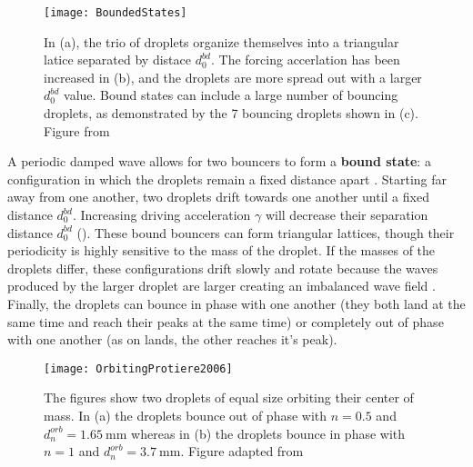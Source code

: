 \begin{figure}[h]
	       \centering
	    \texttt{[image: BoundedStates]}
	     \caption{In (a), the trio of droplets organize themselves into a triangular latice separated by distace $d_{0}^{bd}$. The forcing accerlation has been increased in (b), and the droplets are more spread out with a larger $d_{0}^{bd}$ value. Bound states can include a large number of bouncing droplets, as demonstrated by the 7 bouncing droplets shown in (c).   
	    Figure from~ 
	     }
	 \label{bounded}
	\end{figure}
            A periodic damped wave allows for two bouncers to form a \textbf{bound state}: a configuration in which the droplets remain a fixed distance apart .  Starting far away from one another, two droplets drift towards one another until a fixed distance $d_{0}^{bd}$. Increasing driving acceleration $\gamma$ will decrease their separation distance $d_{0}^{bd}$ (). These bound bouncers can form triangular lattices, though their periodicity is highly sensitive to the mass of the droplet. If the masses of the droplets differ, these configurations drift slowly and rotate because the waves produced by the larger droplet are larger creating an imbalanced wave field . Finally, the droplets can bounce in phase with one another (they both land at the same time and reach their peaks at the same time) or completely out of phase with one another (as on lands, the other reaches it's peak).
            
\begin{figure}[h]
	       \centering
	    \texttt{[image: OrbitingProtiere2006]}
	     \caption{ The figures show two droplets of equal size orbiting their center of mass. In (a) the droplets bounce out of phase with $n = 0.5$ and $d_{n}^{orb} =1.65~\mathrm{mm}$ whereas in (b) the droplets bounce in phase with  $n=1$ and  $d_{n}^{orb} = 3.7~\mathrm{mm}$.
	    Figure adapted from~ 
	     }
	 \label{orbiting}
	\end{figure}
 

